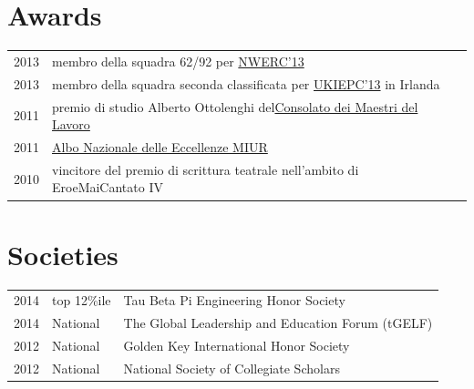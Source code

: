\documentclass[a4paper]{deedy-resume} %
\begin{document}
\begin{minipage}[t]{0.66\textwidth}
\begin{tightitemize}
\item
\end{tightitemize}

\sectionspace %


\section{Awards} 

\begin{tabular}{rll}
2013	 & membro della squadra 62/92 per \href{http://www.nwerc.eu/}{NWERC'13}\\
2013	 & membro della squadra seconda classificata per \href{http://www.cs.nott.ac.uk/~mlw/ukiepc/}{UKIEPC'13} in Irlanda\\
2011	 & premio di studio Alberto Ottolenghi del\href{http://www.maestrilavoro.it/index/elenco_consolati/it-toscana-pisa.html}{Consolato dei Maestri del Lavoro}\\
2011	 & \href{http://www.indire.it/eccellenze/}{Albo Nazionale delle Eccellenze MIUR}\\
2010	 & vincitore del premio di scrittura teatrale nell'ambito di EroeMaiCantato IV\\
\end{tabular}

\sectionspace %


\section{Societies} 

\begin{tabular}{rll}
2014 & top 12\%ile & Tau Beta Pi Engineering Honor Society\\
2014 & National & The Global Leadership and Education Forum (tGELF)\\
2012 & National & Golden Key International Honor Society\\
2012 & National & National Society of Collegiate Scholars\\
\end{tabular}

\sectionspace %


\end{minipage} %
\end{document}
